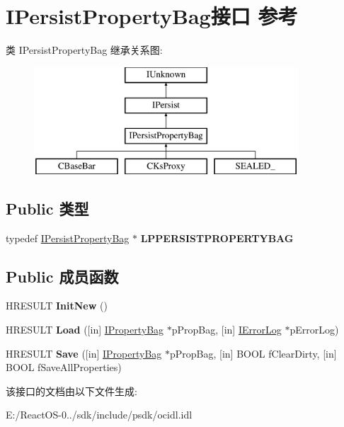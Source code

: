 \hypertarget{interface_i_persist_property_bag}{}\section{I\+Persist\+Property\+Bag接口 参考}
\label{interface_i_persist_property_bag}
类 I\+Persist\+Property\+Bag 继承关系图\+:\begin{figure}[H]
\begin{center}
\leavevmode
\includegraphics[height=4.000000cm]{interface_i_persist_property_bag}
\end{center}
\end{figure}
\subsection*{Public 类型}
\begin{DoxyCompactItemize}
\item 
\mbox{\label{interface_i_persist_property_bag_a0de66a6214a6401e0958456149fdb140}} 
typedef \hyperlink{interface_i_persist_property_bag}{I\+Persist\+Property\+Bag} $\ast$ {\bfseries L\+P\+P\+E\+R\+S\+I\+S\+T\+P\+R\+O\+P\+E\+R\+T\+Y\+B\+AG}
\end{DoxyCompactItemize}
\subsection*{Public 成员函数}
\begin{DoxyCompactItemize}
\item 
\mbox{\label{interface_i_persist_property_bag_a1577969c8ac8a6471e15cb4c5e0295f8}} 
H\+R\+E\+S\+U\+LT {\bfseries Init\+New} ()
\item 
\mbox{\label{interface_i_persist_property_bag_a1016a0a98a5674a7af453bc43b04499e}} 
H\+R\+E\+S\+U\+LT {\bfseries Load} (\mbox{[}in\mbox{]} \hyperlink{interface_i_property_bag}{I\+Property\+Bag} $\ast$p\+Prop\+Bag, \mbox{[}in\mbox{]} \hyperlink{interface_i_error_log}{I\+Error\+Log} $\ast$p\+Error\+Log)
\item 
\mbox{\label{interface_i_persist_property_bag_a1cc9984930032c2685f08086d9225915}} 
H\+R\+E\+S\+U\+LT {\bfseries Save} (\mbox{[}in\mbox{]} \hyperlink{interface_i_property_bag}{I\+Property\+Bag} $\ast$p\+Prop\+Bag, \mbox{[}in\mbox{]} B\+O\+OL f\+Clear\+Dirty, \mbox{[}in\mbox{]} B\+O\+OL f\+Save\+All\+Properties)
\end{DoxyCompactItemize}


该接口的文档由以下文件生成\+:\begin{DoxyCompactItemize}
\item 
E\+:/\+React\+O\+S-\/0../sdk/include/psdk/ocidl.\+idl\end{DoxyCompactItemize}
